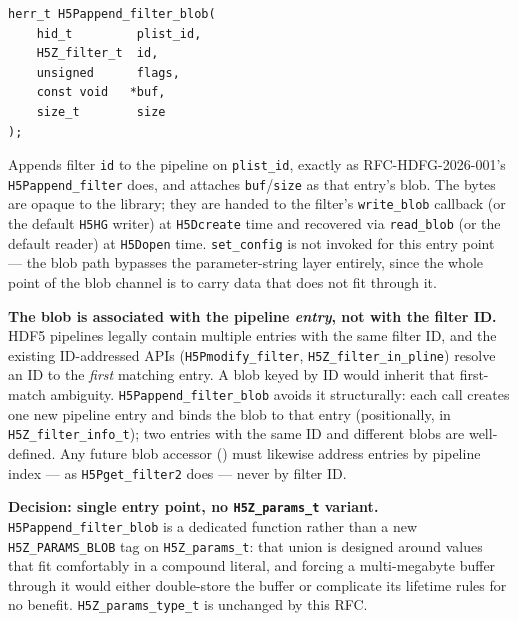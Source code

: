 \documentclass[../RFC-HDFG-2026-003.tex]{subfiles}
\begin{document}
\begin{verbatim}
herr_t H5Pappend_filter_blob(
    hid_t         plist_id,
    H5Z_filter_t  id,
    unsigned      flags,
    const void   *buf,
    size_t        size
);
\end{verbatim}

Appends filter \texttt{id} to the pipeline on \texttt{plist\_id}, exactly
as RFC-HDFG-2026-001's \texttt{H5Pappend\_filter} does, and attaches
\texttt{buf}/\texttt{size} as that entry's blob. The bytes are opaque to
the library; they are handed to the filter's \texttt{write\_blob}
callback (or the default \texttt{H5HG} writer) at \texttt{H5Dcreate}
time and recovered via \texttt{read\_blob} (or the default reader) at
\texttt{H5Dopen} time. \texttt{set\_config} is not invoked for this entry
point --- the blob path bypasses the parameter-string layer entirely,
since the whole point of the blob channel is to carry data that does
not fit through it.

\textbf{The blob is associated with the pipeline \emph{entry}, not with
the filter ID.} HDF5 pipelines legally contain multiple entries with
the same filter ID, and the existing ID-addressed APIs
(\texttt{H5Pmodify\_filter}, \texttt{H5Z\_filter\_in\_pline}) resolve an
ID to the \emph{first} matching entry. A blob keyed by ID would inherit
that first-match ambiguity. \texttt{H5Pappend\_filter\_blob} avoids it
structurally: each call creates one new pipeline entry and binds the
blob to that entry (positionally, in \texttt{H5Z\_filter\_info\_t});
two entries with the same ID and different blobs are well-defined. Any
future blob accessor () must likewise
address entries by pipeline index --- as \texttt{H5Pget\_filter2} does
--- never by filter ID.

\textbf{Decision: single entry point, no \texttt{H5Z\_params\_t}
variant.} \texttt{H5Pappend\_filter\_blob} is a dedicated function
rather than a new \texttt{H5Z\_PARAMS\_BLOB} tag on
\texttt{H5Z\_params\_t}: that union is designed around values that fit
comfortably in a compound literal, and forcing a multi-megabyte buffer
through it would either double-store the buffer or complicate its
lifetime rules for no benefit. \texttt{H5Z\_params\_type\_t} is
unchanged by this RFC.
\end{document}
